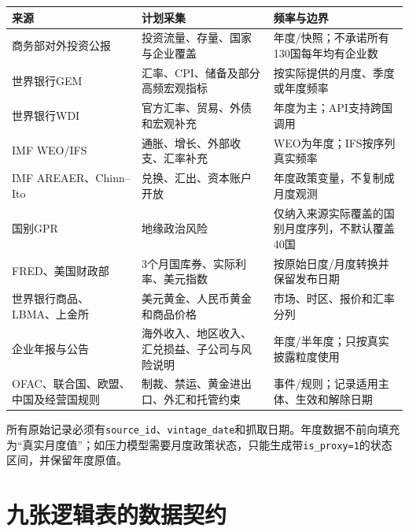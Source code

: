 \documentclass[UTF8,fontset=windows,12pt,openany]{ctexbook}
\newcommand{\Field}[1]{{\small\nolinkurl{#1}}}
\begin{document}
\begin{longtable}{p{3.0cm}p{5.1cm}p{5.2cm}}
\toprule
\textbf{来源} & \textbf{计划采集} & \textbf{频率与边界}\\
\midrule
商务部对外投资公报 & 投资流量、存量、国家与企业覆盖 & 年度/快照；不承诺所有130国每年均有企业数\\
世界银行GEM & 汇率、CPI、储备及部分高频宏观指标 & 按实际提供的月度、季度或年度频率\cite{wbgem}\\
世界银行WDI & 官方汇率、贸易、外债和宏观补充 & 年度为主；API支持跨国调用\cite{wbapi}\\
IMF WEO/IFS & 通胀、增长、外部收支、汇率补充 & WEO为年度；IFS按序列真实频率\cite{imfweo}\\
IMF AREAER、Chinn--Ito & 兑换、汇出、资本账户开放 & 年度政策变量，不复制成月度观测\cite{imfareaer,chinnito}\\
国别GPR & 地缘政治风险 & 仅纳入来源实际覆盖的国别月度序列，不默认覆盖40国\cite{countrygpr}\\
FRED、美国财政部 & 3个月国库券、实际利率、美元指数 & 按原始日度/月度转换并保留发布日期\cite{fred}\\
世界银行商品、LBMA、上金所 & 美元黄金、人民币黄金和商品价格 & 市场、时区、报价和汇率分列\cite{worldbankpink,sgebenchmark}\\
企业年报与公告 & 海外收入、地区收入、汇兑损益、子公司与风险说明 & 年度/半年度；只按真实披露粒度使用\\
OFAC、联合国、欧盟、中国及经营国规则 & 制裁、禁运、黄金进出口、外汇和托管约束 & 事件/规则；记录适用主体、生效和解除日期\cite{ofac1029}\\
\bottomrule
\end{longtable}

所有原始记录必须有\Field{source_id}、\Field{vintage_date}和抓取日期。年度数据不前向填充为“真实月度值”；如压力模型需要月度政策状态，只能生成带\Field{is_proxy=1}的状态区间，并保留年度原值。

\chapter{九张逻辑表的数据契约}
\end{document}
